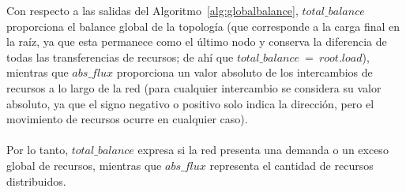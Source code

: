 Con respecto a las salidas del Algoritmo~\ref{alg:globalbalance}, $total\_balance$ proporciona el balance global de la topología (que corresponde a la carga final en la raíz, ya que esta permanece como el último nodo y conserva la diferencia de todas las transferencias de recursos; de ahí que $total\_balance \: = \: root.load$), mientras que $abs\_flux$ proporciona un valor absoluto de los intercambios de recursos a lo largo de la red (para cualquier intercambio se considera su valor absoluto, ya que el signo negativo o positivo solo indica la dirección, pero el movimiento de recursos ocurre en cualquier caso). \\
\\
Por lo tanto, $total\_balance$ expresa si la red presenta una demanda o un exceso global de recursos, mientras que $abs\_flux$ representa el cantidad de recursos distribuidos. 

